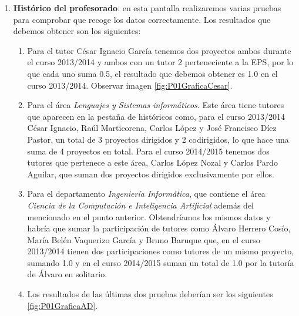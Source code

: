 \begin{enumerate}
	\item \textbf{Histórico del profesorado}: en esta pantalla realizaremos varias pruebas para comprobar que recoge los datos correctamente. Los resultados que debemos obtener son los siguientes:
		\begin{enumerate}
			\item Para el tutor César Ignacio García tenemos dos proyectos ambos durante el curso 2013/2014 y ambos con un tutor 2 perteneciente a la EPS, por lo que cada uno suma 0.5, el resultado que debemos obtener es 1.0 en el curso 2013/2014. Observar imagen \ref{fig:P01GraficaCesar}.
			\item Para el área \emph{Lenguajes y Sistemas informáticos}. Este área tiene tutores que aparecen en la pestaña de históricos como, para el curso 2013/2014 César Ignacio, Raúl Marticorena, Carlos López y José Francisco Díez Pastor, un total de 3 proyectos dirigidos y 2 codirigidos, lo que hace una suma de 4 proyectos en total. Para el curso 2014/2015 tenemos dos tutores que pertenece a este área, Carlos López Nozal y Carlos Pardo Aguilar, que suman dos proyectos dirigidos exclusivamente por ellos. 
			
			\item Para el departamento \emph{Ingeniería Informática}, que contiene el área \emph{Ciencia de la Computación e Inteligencia Artificial} además del mencionado en el punto anterior. Obtendríamos los mismos datos y habría que sumar la participación de tutores como Álvaro Herrero Cosío, María Belén Vaquerizo García y Bruno Baruque que, en el curso 2013/2014 tienen dos participaciones como tutores de un mismo proyecto, sumando 1.0 y en el curso 2014/2015 suman un total de 1.0 por la tutoría de Álvaro en solitario.
			
			\item Los resultados de las últimas dos pruebas deberían ser los siguientes \ref{fig:P01GraficaAD}.
		\end{enumerate}


\end{enumerate}

